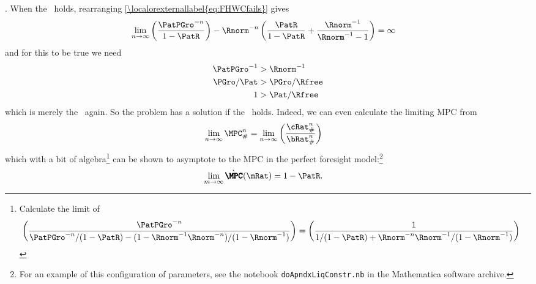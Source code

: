 \documentclass[\econtexRoot/BufferStockTheory]{subfiles}
\begin{document}
.  When the \RIC~holds, rearranging \eqref{\localorexternallabel{eq:FHWCfails}} gives
\begin{eqnarray*}
  \lim_{n \rightarrow \infty} \left(\frac{\PatPGro^{-n}}{1-\PatR}\right)-\Rnorm^{-n}\left(\frac{\PatR}{1-\PatR}+\frac{\Rnorm^{-1}}{\Rnorm^{-1}-1}\right)  & = \infty
\end{eqnarray*}
and for this to be true we need
\begin{eqnarray*}
  \PatPGro^{-1}  & > \Rnorm^{-1}
  \\ \PGro/\Pat  & > \PGro/\Rfree
  \\ 1  & > \Pat/\Rfree
\end{eqnarray*}
which is merely the \RIC~again.  So the problem has a solution if the \RIC~holds.  Indeed,
we can even calculate the limiting MPC from
\begin{equation}\begin{gathered}\begin{aligned}
  \lim_{n \rightarrow \infty} \MPC^{n}_{\#}  & = \lim_{n \rightarrow \infty} \left(\frac{\cRat_{\#}^{n}}{\bRat_{\#}^{n}}\right) \label{eq:MPCConstrLim}
\end{aligned}\end{gathered}\end{equation}
which with a bit of algebra\footnote{
  Calculate the limit of
  \begin{equation}\begin{gathered}\begin{aligned}
    \left(\frac{\PatPGro^{-n}}{\PatPGro^{-n}/(1-\PatR) - (1-\Rnorm^{-1}\Rnorm^{-n})/(1-\Rnorm^{-1})}\right)  & = \left(\frac{1}{1/(1-\PatR) + \Rnorm^{-n}\Rnorm^{-1}/(1-\Rnorm^{-1})}\right)
  \end{aligned}\end{gathered}\end{equation}} can be shown to asymptote to the MPC in the perfect foresight model:\footnote{For an example of this configuration of parameters, see the notebook \texttt{doApndxLiqConstr.nb} in the Mathematica software  archive.}
\begin{equation}\begin{gathered}\begin{aligned}
  \lim_{m \rightarrow \infty} \grave{\pmb{\MPC}}(\mRat)  & = 1-\PatR.
\end{aligned}\end{gathered}\end{equation}
\end{document}

